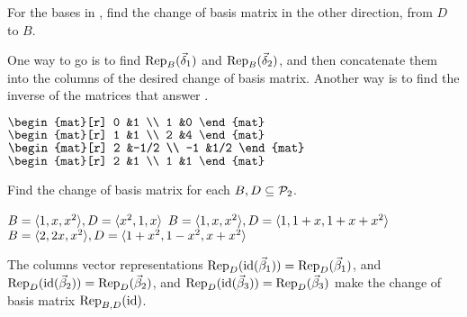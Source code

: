 \begin{exercises}
\begin{answer}
    \end{answer}
  \item 
    For the bases in , 
    find the change of basis matrix in the other direction, from $D$ to $B$.
    \begin{answer}
       One way to go is to find 
       $\rep{\vec{\delta}_1}{B}$ and $\rep{\vec{\delta}_2}{B}$,
       and then concatenate them into the columns of the desired 
       change of basis matrix.
       Another way is to find the inverse of the matrices that answer
       . 
       \begin{exparts*}
        \partsitem
          $\begin{mat}[r]
            0  &1  \\
            1  &0
          \end{mat}$
        \partsitem \( \begin{mat}[r]
            1  &1  \\
            2  &4
          \end{mat} \)
        \partsitem \( \begin{mat}[r]
            2  &-1/2  \\
            -1 &1/2
          \end{mat} \)
        \partsitem \( \begin{mat}[r]
            2  &1  \\
            1  &1
          \end{mat} \)
      \end{exparts*} 
    \end{answer}
  \recommended \item
    Find the change of basis matrix for each \( B,D\subseteq\polyspace_2 \).
    \begin{exparts*}
      \partsitem \( B=\sequence{1,x,x^2},
               D=\sequence{x^2,1,x} \)
      \partsitem \( B=\sequence{1,x,x^2},
               D=\sequence{1,1+x,1+x+x^2} \)
      \partsitem \( B=\sequence{2,2x,x^2},
               D=\sequence{1+x^2,1-x^2,x+x^2} \)
    \end{exparts*}
    \begin{answer}
      The columns vector representations
      $\rep{\identity(\vec{\beta}_1)}{D}=\rep{\vec{\beta}_1}{D}$,
      and $\rep{\identity(\vec{\beta}_2)}{D}=\rep{\vec{\beta}_2}{D}$,
      and $\rep{\identity(\vec{\beta}_3)}{D}=\rep{\vec{\beta}_3}{D}$
      make the change of basis matrix
      $\rep{\identity}{B,D}$.
      \begin{exparts*}

\end{exparts*}
\end{answer}
\end{exercises}

